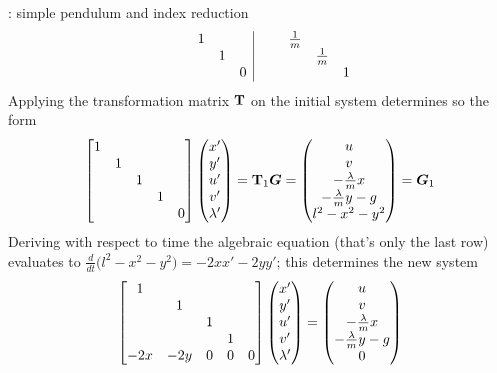 \begin{example}{: simple pendulum and index reduction}
\[{\begin{array} {ccccc | ccccc}
			&& 1 &&&&& \frac 1m \\
			&&& 1 &&&&& \frac 1m \\
			&&&& 0 &&&&& 1 \\
		\end{array}}  \]
		Applying the transformation matrix $\mathbf{T}$ on the initial system determines so the form
		\[ \begin{bmatrix}  1  \\ & 1 \\ && 1 \\ &&& 1 \\ &&&& 0  \end{bmatrix} \begin{pmatrix} x' \\ y' \\ u' \\ v' \\ \lambda' \end{pmatrix} = \mathbf{T}_1 \boldsymbol{G} = \begin{pmatrix} u \\ v \\ - \frac \lambda m x \\ -\frac \lambda m  y - g \\ l^2 - x^2 - y^2 \end{pmatrix} = \boldsymbol{G}_1 \]
		Deriving with respect to time the algebraic equation (that's only the last row) evaluates to $\frac{d}{dt}\big(l^2 - x^2 - y^2\big) = - 2xx' - 2y y'$; this determines the new system
		\[ \begin{bmatrix}  1  \\ & 1 \\ && 1 \\ &&& 1 \\ -2x & -2y & 0 & 0 & 0  \end{bmatrix} \begin{pmatrix} x' \\ y' \\ u' \\ v' \\ \lambda' \end{pmatrix} = \begin{pmatrix} u \\ v \\ - \frac \lambda m x \\ -\frac \lambda m  y - g \\ 0 \end{pmatrix} \]
		

\end{example}
